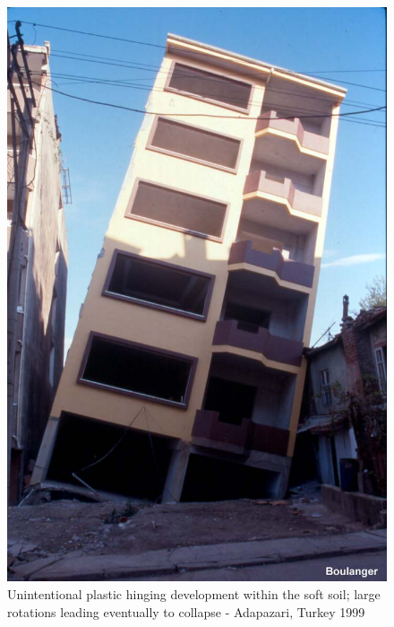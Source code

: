 \documentclass[11pt,a4paper]{report}
\begin{document}
\begin{figure}[!h]
\begin{minipage}[b]{0.4\textwidth}
		\includegraphics[width=\textwidth]{example3}
		\caption{Unintentional plastic hinging development within the soft soil; large rotations leading eventually to collapse - Adapazari, Turkey 1999}
		\label{turkey}
	\end{minipage}
\end{figure}
\end{document}
